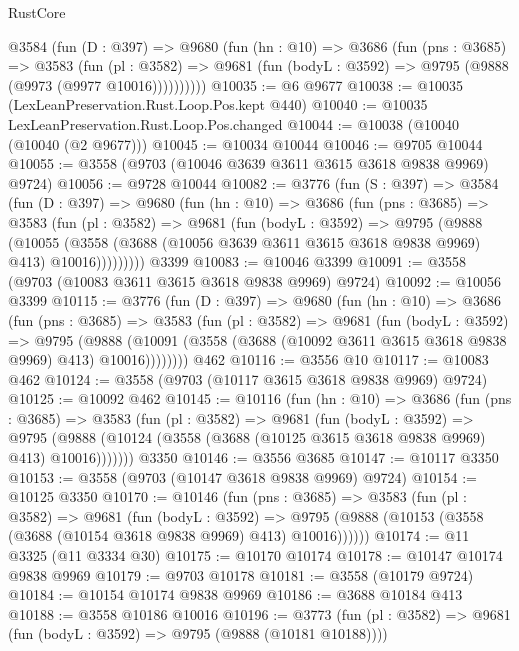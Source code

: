 \begin{lexlean}{RustCore}
\begin{coremodule}
      @3584
        (fun (D : @397) =>
        @9680
          (fun (hn : @10) =>
          @3686
            (fun (pns : @3685) =>
            @3583
              (fun (pl : @3582) =>
              @9681 (fun (bodyL : @3592) => @9795 (@9888 (@9973 (@9977 @10016))))))))))
@10035 := @6 @9677
@10038 := @10035 (LexLeanPreservation.Rust.Loop.Pos.kept @440)
@10040 := @10035 LexLeanPreservation.Rust.Loop.Pos.changed
@10044 := @10038 (@10040 (@10040 (@2 @9677)))
@10045 := @10034 @10044
@10046 := @9705 @10044
@10055 := @3558 (@9703 (@10046 @3639 @3611 @3615 @3618 @9838 @9969) @9724)
@10056 := @9728 @10044
@10082 := @3776
    (fun (S : @397) =>
    @3584
      (fun (D : @397) =>
      @9680
        (fun (hn : @10) =>
        @3686
          (fun (pns : @3685) =>
          @3583
            (fun (pl : @3582) =>
            @9681
              (fun (bodyL : @3592) =>
              @9795
                (@9888
                  (@10055
                    (@3558 (@3688 (@10056 @3639 @3611 @3615 @3618 @9838 @9969) @413) @10016)))))))))
    @3399
@10083 := @10046 @3399
@10091 := @3558 (@9703 (@10083 @3611 @3615 @3618 @9838 @9969) @9724)
@10092 := @10056 @3399
@10115 := @3776
    (fun (D : @397) =>
    @9680
      (fun (hn : @10) =>
      @3686
        (fun (pns : @3685) =>
        @3583
          (fun (pl : @3582) =>
          @9681
            (fun (bodyL : @3592) =>
            @9795
              (@9888
                (@10091 (@3558 (@3688 (@10092 @3611 @3615 @3618 @9838 @9969) @413) @10016))))))))
    @462
@10116 := @3556 @10
@10117 := @10083 @462
@10124 := @3558 (@9703 (@10117 @3615 @3618 @9838 @9969) @9724)
@10125 := @10092 @462
@10145 := @10116
    (fun (hn : @10) =>
    @3686
      (fun (pns : @3685) =>
      @3583
        (fun (pl : @3582) =>
        @9681
          (fun (bodyL : @3592) =>
          @9795 (@9888 (@10124 (@3558 (@3688 (@10125 @3615 @3618 @9838 @9969) @413) @10016)))))))
    @3350
@10146 := @3556 @3685
@10147 := @10117 @3350
@10153 := @3558 (@9703 (@10147 @3618 @9838 @9969) @9724)
@10154 := @10125 @3350
@10170 := @10146
    (fun (pns : @3685) =>
    @3583
      (fun (pl : @3582) =>
      @9681
        (fun (bodyL : @3592) =>
        @9795 (@9888 (@10153 (@3558 (@3688 (@10154 @3618 @9838 @9969) @413) @10016))))))
@10174 := @11 @3325 (@11 @3334 @30)
@10175 := @10170 @10174
@10178 := @10147 @10174 @9838 @9969
@10179 := @9703 @10178
@10181 := @3558 (@10179 @9724)
@10184 := @10154 @10174 @9838 @9969
@10186 := @3688 @10184 @413
@10188 := @3558 @10186 @10016
@10196 := @3773
    (fun (pl : @3582) => @9681 (fun (bodyL : @3592) => @9795 (@9888 (@10181 @10188))))

\end{coremodule}
\end{lexlean}
